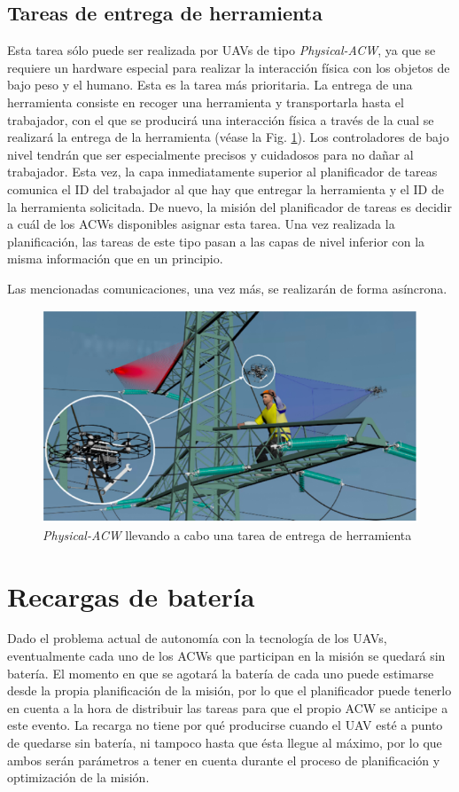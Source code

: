 \documentclass[fontsize=11pt, English=false, Español=true, Myfinal=true, twoside, numbers=noenddot]{scrbook}
\begin{document}
{\subsection{Tareas de entrega de herramienta}
\label{subsec:ToolDeliveryTasks}
Esta tarea sólo puede ser realizada por \glspl{UAV} de tipo \textit{Physical-ACW}, ya que se requiere un hardware especial para realizar la interacción física con los objetos de bajo peso y el humano. Esta es la tarea más prioritaria. La entrega de una herramienta consiste en recoger una herramienta y transportarla hasta el trabajador, con el que se producirá una interacción física a través de la cual se realizará la entrega de la herramienta (véase la Fig. \ref{fig:deliver_task}). Los controladores de bajo nivel tendrán que ser especialmente precisos y cuidadosos para no dañar al trabajador. Esta vez, la capa inmediatamente superior al planificador de tareas comunica el \gls{ID} del trabajador al que hay que entregar la herramienta y el \gls{ID} de la herramienta solicitada. De nuevo, la misión del planificador de tareas es decidir a cuál de los \glspl{ACW} disponibles asignar esta tarea. Una vez realizada la planificación, las tareas de este tipo pasan a las capas de nivel inferior con la misma información que en un principio.

Las mencionadas comunicaciones, una vez más, se realizarán de forma asíncrona. 


\begin{figure}[htbp]
    \centering
    \includegraphics[width=0.7\linewidth]
    {ProblemFormulation/figures/deliver_task.png}
    \caption{\textit{Physical-ACW} llevando a cabo una tarea de entrega de herramienta}
    \label{fig:deliver_task}
\end{figure}

\section{Recargas de batería}
\label{sec:BatteryRecharges}
Dado el problema actual de autonomía con la tecnología de los \glspl{UAV}, eventualmente cada uno de los \glspl{ACW} que participan en la misión se quedará sin batería. El momento en que se agotará la batería de cada uno puede estimarse desde la propia planificación de la misión, por lo que el planificador puede tenerlo en cuenta a la hora de distribuir las tareas para que el propio \gls{ACW} se anticipe a este evento. La recarga no tiene por qué producirse cuando el \gls{UAV} esté a punto de quedarse sin batería, ni tampoco hasta que ésta llegue al máximo, por lo que ambos serán parámetros a tener en cuenta durante el proceso de planificación y optimización de la misión.

}
\end{document}
